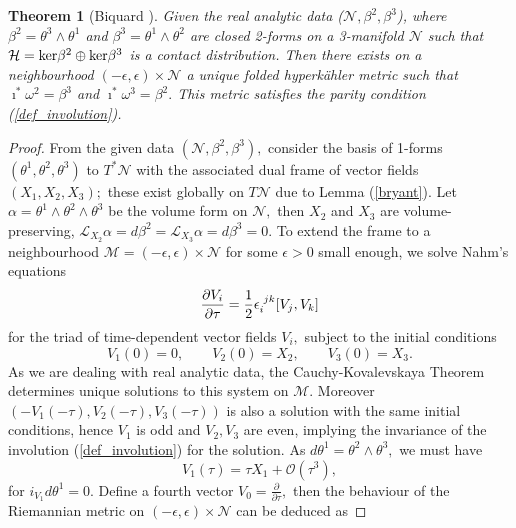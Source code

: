 \documentclass[a4paper,12pt, onecolumn, notitlepage]{article}
\newtheorem{thm}{Theorem}[]
\theoremstyle{definition}
\theoremstyle{remark}
\newcommand{\al}{\alpha}
\newcommand{\w}{\omega}
\newcommand{\e}{\epsilon}
\newcommand{\ddt}[1]{\frac{\partial #1}{\partial \tau}}
\newcommand{\HK}{hyperk\"ahler }
\begin{document}
\begin{thm}[Biquard \cite{biquard_2015}]
	\label{thm_biquard}
	Given the real analytic data ($\mathcal{N}, \beta^{2}, \beta^{3}$), where $\beta^{2}=\theta^{3}\wedge \theta^{1}$ and $\beta^{3}=\theta^{1}\wedge \theta^{2}$ are closed 2-forms on a 3-manifold $\mathcal{N}$ such that $\mathcal{H}=\textnormal{ker}\beta^{2}\oplus\textnormal{ker}\beta^{3}$ is a contact distribution. Then there exists on a neighbourhood $(-\e,\e)\times\mathcal{N}$ a unique folded \HK metric such that $\imath^{\ast}\w^{2}=\beta^{3}$ and $\imath^{\ast}\w^{3}=\beta^{2}.$ This metric satisfies the parity condition (\ref{def_involution}).
\end{thm}
\begin{proof}
	From the given data $(\mathcal{N},\beta^{2},\beta^{3}),$ consider the basis of 1-forms $(\theta^{1},\theta^{2},\theta^{3})$ to $T^{\ast}\mathcal{N}$ with the associated dual frame of vector fields $(X_{1},X_{2},X_{3});$ these exist globally on $T\mathcal{N}$ due to Lemma (\ref{bryant}). Let $\al=\theta^{1}\wedge\theta^{2}\wedge\theta^{3}$ be the volume form on $\mathcal{N},$ then $X_{2}$ and $X_{3}$ are volume-preserving, $\mathcal{L}_{X_2}\al=d\beta^{2}=\mathcal{L}_{X_3}\al=d\beta^{3}=0.$ To extend the frame to a neighbourhood $\mathcal{M}=(-\e,\e)\times\mathcal{N}$ for some $\e>0$ small enough, we solve Nahm's equations
	\begin{equation*}
		\ddt{V_{i}}=\frac{1}{2}\e\indices{_i^j^k}[V_{j},V_{k}]
	\end{equation*}
	for the triad of time-dependent vector fields $V_{i},$ subject to the initial conditions
	\begin{equation*}
		V_{1}(0)=0,\qquad V_{2}(0)=X_{2},\qquad V_{3}(0) = X_{3}.
	\end{equation*}
	As we are dealing with real analytic data, the Cauchy-Kovalevskaya Theorem \cite{evans_2010} determines unique solutions to this system on $\mathcal{M}.$ Moreover $(-V_{1}(-\tau),V_{2}(-\tau),V_{3}(-\tau))$ is also a solution with the same initial conditions, hence $V_{1}$ is odd and $V_{2}, V_{3}$ are even, implying the invariance of the involution (\ref{def_involution}) for the solution. As $d\theta^{1}=\theta^{2}\wedge\theta^{3},$ we must have
	\begin{equation*}
		V_{1}(\tau) = \tau X_{1} + \mathcal{O}(\tau^{3}),
	\end{equation*}
	for $i_{V_{1}}d\theta^{1}=0.$ Define a fourth vector $V_{0}=\ddt{},$ then the behaviour of the Riemannian metric on $(-\e,\e)\times\mathcal{N}$ can be deduced as

\end{proof}
\end{document}
